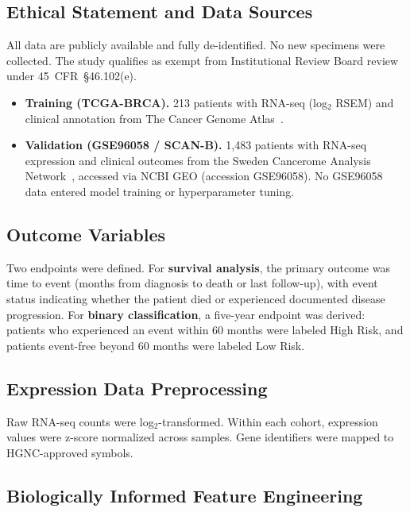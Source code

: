 \documentclass[journal]{IEEEtran}
\begin{document}
\subsection{Ethical Statement and Data Sources}

All data are publicly available and fully de-identified. No new specimens were collected. The study qualifies as exempt from Institutional Review Board review under 45~CFR~\S46.102(e).

\begin{itemize}
    \item \textbf{Training (TCGA-BRCA).} 213 patients with RNA-seq (log$_2$ RSEM) and clinical annotation from The Cancer Genome Atlas~\cite{tcga2012}.
    \item \textbf{Validation (GSE96058 / SCAN-B).} 1,483 patients with RNA-seq expression and clinical outcomes from the Sweden Cancerome Analysis Network~\cite{saal2015,brueffer2018}, accessed via NCBI GEO (accession GSE96058). No GSE96058 data entered model training or hyperparameter tuning.
\end{itemize}

\subsection{Outcome Variables}

Two endpoints were defined. For \textbf{survival analysis}, the primary outcome was time to event (months from diagnosis to death or last follow-up), with event status indicating whether the patient died or experienced documented disease progression. For \textbf{binary classification}, a five-year endpoint was derived: patients who experienced an event within 60 months were labeled High Risk, and patients event-free beyond 60 months were labeled Low Risk.

\subsection{Expression Data Preprocessing}

Raw RNA-seq counts were log$_2$-transformed. Within each cohort, expression values were z-score normalized across samples. Gene identifiers were mapped to HGNC-approved symbols.

\subsection{Biologically Informed Feature Engineering}
\end{document}
